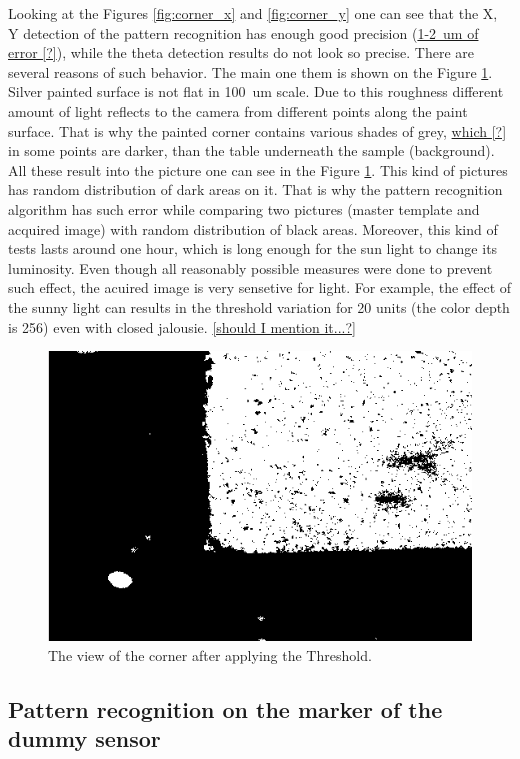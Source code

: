 Looking at the Figures \ref{fig:corner_x} and \ref{fig:corner_y} one can see that the X, Y detection of the pattern recognition has enough good precision (\underline{1-2~um of error [?]}), while the theta detection results do not look so precise. There are several reasons of such behavior. The main one them is shown on the Figure \ref{fig:corner_threshold}.
\\Silver painted surface is not flat in 100~um scale. Due to this roughness different amount of light reflects to the camera from different points along the paint surface. That is why the painted corner contains various shades of grey, \underline{which [?]} in some points are darker, than the table underneath the sample (background). All these result into the picture one can see in the Figure \ref{fig:corner_threshold}. This kind of pictures has random distribution of dark areas on it. That is why the pattern recognition algorithm has such error while comparing two pictures (master template and acquired image) with random distribution of black areas. Moreover, this kind of tests lasts around one hour, which is long enough for the sun light to change its luminosity. Even though all reasonably possible measures were done to prevent such effect, the acuired image is very sensetive for light. For example, the effect of the sunny light can results in the threshold variation for 20 units (the color depth is 256) even with closed jalousie. \underline{[should I mention it...?]}

\begin{figure}[ht]\centering
\includegraphics[width=0.8\linewidth]{Data/Precision_tests/Corner_thresholded.png}
\caption{The view of the corner after applying the Threshold.}
\label{fig:corner_threshold}
\end{figure}

\subsection{Pattern recognition on the marker of the dummy sensor}

